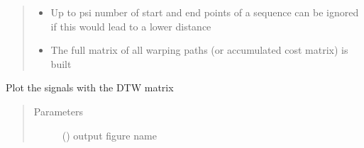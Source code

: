 \documentclass[letterpaper,10pt,english]{sphinxmanual}
\begin{document}
\begin{fulllineitems}
\begin{fulllineitems}
\begin{quote}
\begin{description}
\begin{itemize}
\item {} 
\sphinxAtStartPar
{} \textendash{} Up to psi number of start and end points of a sequence can be ignored if this would lead to a lower distance

\item {} 
\sphinxAtStartPar
{} \textendash{} The full matrix of all warping paths (or accumulated cost matrix) is built

\end{itemize}

\end{description}\end{quote}

\end{fulllineitems}


\begin{fulllineitems}
\label{\detokenize{modules/dtw_analysis:dtwhaclustering.dtw_analysis.dtw_signal_pairs.plot_matrix}}
\sphinxAtStartPar
Plot the signals with the DTW matrix
\begin{quote}\begin{description}
\item[{Parameters}] \leavevmode
\sphinxAtStartPar
{} () \textendash{} output figure name

\end{description}\end{quote}

\end{fulllineitems}



\end{fulllineitems}
\end{document}
